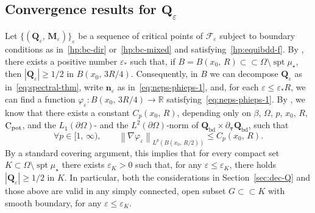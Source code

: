 \documentclass[a4paper, 11pt, twoside, leqno]{article}
\theoremstyle{definition}              %
\theoremstyle{remark}                  %
\DeclareMathOperator{\spt}{spt}                                     %
\newcommand{\abs}[1]{\left| #1 \right|}                             %
\newcommand{\norm}[1]{\left\| #1 \right\|}                          %
\newcommand{\csubset}{\subset\!\subset}                             %
\newcommand{\R}{\mathbb{R}}
\newcommand{\Q}{\mathbf{Q}}
\newcommand{\M}{\mathbf{M}}
\newcommand{\n}{\mathbf{n}}
\newcommand{\F}{\mathscr{F}}
\newcommand{\eps}{\varepsilon}
\newcommand{\ttau}{{\boldsymbol{\tau}}}
\newcommand{\Qb}{\Q_{\mathrm{bd}}}
\begin{document}
\subsection{Convergence results for $\Q_\eps$}\label{sec:Qeps}
Let $\{(\Q_\eps,\,\M_\eps)\}_\eps$ be a sequence of critical points of $\F_\eps$ 
subject to boundary conditions as in~\eqref{hp:bc-dir} or~\eqref{hp:bc-mixed} and 
satisfying~\eqref{hp:equibdd-f}. 
By \cite[Proposition~2.5 and Lemma~3.3]{CDS1}, there exists a positive number 
$\eps_*$ such that, if $B = B(x_0, \, R) \csubset \Omega \setminus \spt\mu_\star$, 
then $\abs{\Q_\eps} \geq 1/2$ in $B(x_0,\,3R/4)$. 
Consequently, in $B$ we can decompose $\Q_\eps$ 
as in~\eqref{eq:spectral-thm}, write $\n_\eps$ as in~\eqref{eq:neps-phieps-1}, 
and, for each $\eps \leq \eps_* R$, we can find a function 
$\varphi_\eps : B(x_0,\,3R/4) \to \R$ satisfying~\eqref{eq:neps-phieps-1}. 
By \cite[Step~2 of Proposition~2.5]{CDS1}, we know that
there exists a 
constant $C_p(x_0,\,R)$, depending only on $\beta$, $\Omega$, $p$, $x_0$, $R$, 
${\rm C}_{\rm pot}$, and the $L_1(\partial\Omega)$- and the $L^2(\partial\Omega)$-norm
of $\Qb \times \partial_{\ttau}\Qb$, such that 
\begin{equation}\label{eq:varphi-Lp-bounds}
    \forall p \in [1,\,\infty), \qquad 
    \norm{\nabla \varphi_\eps}_{L^p(B(x_0,\,R/2))} \leq C_{p}(x_0,\,R).
\end{equation}
By a standard covering argument, this implies that 
for every compact set $K \subset \Omega \setminus \spt\mu_\star$ 
there exists $\eps_K >0$ such that, for any $\eps \leq \eps_K$, 
there holds $\abs{\Q_\eps} \geq 1/2$ in $K$. In particular, 
both the considerations in Section~\ref{sec:dec-Q} and those above are valid in 
any simply connected, open subset $G \csubset K$ with smooth boundary, 
for any $\eps \leq \eps_K$. 
\end{document}
